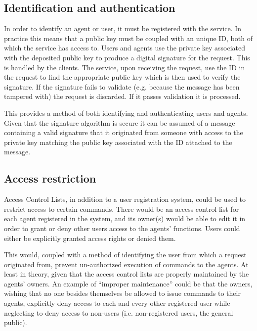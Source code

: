 \subsection{Identification and authentication}
In order to identify an agent or user, it must be registered with the service.
In practice this means that a public key must be coupled with an unique ID, both of which the service has access to.
Users and agents use the private key associated with the deposited public key to produce a digital signature for the request.
This is handled by the clients.
The service, upon receiving the request, use the ID in the request to find the appropriate public key which is then used to verify the signature.
If the signature fails to validate (e.g. because the message has been tampered with) the request is discarded.
If it passes validation it is processed.

This provides a method of both identifying and authenticating users and agents.
Given that the signature algorithm is secure it can be assumed of a message containing a valid signature that it originated from someone with access to the private key matching the public key associated with the ID attached to the message.

\subsection{Access restriction}
Access Control Lists, in addition to a user registration system, could be used to restrict access to certain commands.
There would be an access control list for each agent registered in the system, and its owner(s) would be able to edit it in order to grant or deny other users access to the agents' functions.
Users could either be explicitly granted access rights or denied them.

This would, coupled with a method of identifying the user from which a request originated from, prevent un-authorized execution of commands to the agents.
At least in theory, given that the access control lists are properly maintained by the agents' owners.
An example of ``improper maintenance'' could be that the owners, wishing that no one besides themselves be allowed to issue commands to their agents, explicitly deny access to each and every other registered user while neglecting to deny access to non-users (i.e. non-registered users, the general public).

